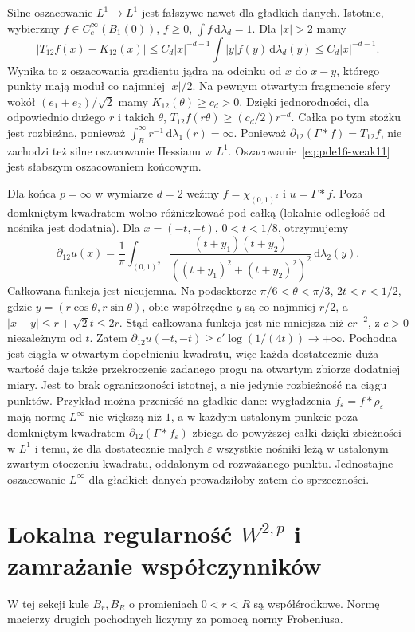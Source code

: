 \begin{uwaga}
\label{rem:pde16-endpoints}
Silne oszacowanie $L^1\to L^1$ jest fałszywe nawet
dla gładkich danych. Istotnie, wybierzmy
$f\in C_c^\infty(B_1(0))$, $f\ge0$, $\int f\,\mathrm d\lambda_d=1$.
Dla $|x|>2$ mamy
\[
 |T_{12}f(x)-K_{12}(x)|
 \le C_d|x|^{-d-1}\int |y|f(y)\,\mathrm d\lambda_d(y)
 \le C_d|x|^{-d-1}.
\]
Wynika to z oszacowania gradientu jądra na odcinku
od $x$ do $x-y$, którego punkty mają moduł co najmniej
$|x|/2$. Na pewnym otwartym fragmencie sfery wokół
$(e_1+e_2)/\sqrt2$ mamy $K_{12}(\theta)\ge c_d>0$.
Dzięki jednorodności, dla odpowiednio dużego $r$ i takich
$\theta$, $T_{12}f(r\theta)\ge(c_d/2)r^{-d}$.
Całka po tym stożku jest rozbieżna, ponieważ
$\int_R^\infty r^{-1}\,\mathrm d\lambda_1(r)=\infty$.
Ponieważ $\partial_{12}(\Gamma*f)=T_{12}f$,
nie zachodzi też silne oszacowanie Hessianu w $L^1$.
Oszacowanie~\eqref{eq:pde16-weak11} jest słabszym
oszacowaniem końcowym.

Dla końca $p=\infty$ w wymiarze $d=2$ weźmy
$f=\chi_{(0,1)^2}$ i $u=\Gamma*f$.
Poza domkniętym kwadratem wolno różniczkować pod całką
(lokalnie odległość od nośnika jest dodatnia).
Dla $x=(-t,-t)$, $0<t<1/8$, otrzymujemy
\[
 \partial_{12}u(x)=\frac1\pi
 \int_{(0,1)^2}
 \frac{(t+y_1)(t+y_2)}
 {((t+y_1)^2+(t+y_2)^2)^2}\,\mathrm d\lambda_2(y).
\]
Całkowana funkcja jest nieujemna. Na podsektorze
$\pi/6<\theta<\pi/3$, $2t<r<1/2$, gdzie
$y=(r\cos\theta,r\sin\theta)$, obie współrzędne $y$
są co najmniej $r/2$, a $|x-y|\le r+\sqrt2t\le2r$.
Stąd całkowana funkcja jest nie mniejsza niż $c r^{-2}$,
z $c>0$ niezależnym od $t$. Zatem
$\partial_{12}u(-t,-t)\ge c'\log(1/(4t))\to+\infty$.
Pochodna jest ciągła w otwartym dopełnieniu kwadratu,
więc każda dostatecznie duża wartość daje także
przekroczenie zadanego progu na otwartym zbiorze
dodatniej miary. Jest to brak ograniczoności istotnej,
a nie jedynie rozbieżność na ciągu punktów.
Przykład można przenieść na gładkie dane: wygładzenia
$f_\varepsilon=f*\rho_\varepsilon$ mają normę
$L^\infty$ nie większą niż $1$, a w każdym ustalonym
punkcie poza domkniętym kwadratem
$\partial_{12}(\Gamma*f_\varepsilon)$ zbiega
do powyższej całki dzięki zbieżności w $L^1$
i temu, że dla dostatecznie małych $\varepsilon$
wszystkie nośniki leżą w ustalonym zwartym otoczeniu
kwadratu, oddalonym od rozważanego punktu.
Jednostajne oszacowanie $L^\infty$ dla gładkich danych
prowadziłoby zatem do sprzeczności.
\end{uwaga}

\section[Lokalna regularność Sobolewa i zamrażanie współczynników]{Lokalna regularność $W^{2,p}$ i zamrażanie współczynników}
W tej sekcji kule $B_r,B_R$ o promieniach $0<r<R$
są współśrodkowe. Normę macierzy drugich pochodnych
liczymy za pomocą normy Frobeniusa.

